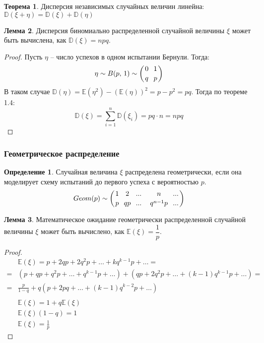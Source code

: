 \documentclass[12pt]{article}
\theoremstyle{definition}
\newtheorem{theorem}{Теорема}[section]
\newtheorem{lemma}[theorem]{Лемма}
\newtheorem{definition}{Определение}
\newcommand{\E}{\mathbb{E}}
\newcommand{\D}{\mathbb{D}}
\begin{document}
\begin{theorem}
    Дисперсия независимых случайных величин линейна: $\D(\xi+\eta)=\D(\xi)+\D(\eta)$
\end{theorem}

\begin{lemma}
    Дисперсия биномиально распределенной случайной величины $\xi$ может быть вычислена, как $\D(\xi)=npq$.
\end{lemma}

\begin{proof}
    Пусть $\eta$ -- число успехов в одном испытании Бернули. Тогда:
    $$\eta \sim B(p,\,1) \sim \left({0 \atop q} \,\,\, {1 \atop p}\right)$$
    В таком случае $\D(\eta)=\E(\eta^2)-(\E(\eta))^2=p-p^2=pq$. Тогда по теореме 1.4:
    $$\D(\xi)=\sum_{i=1}^{n}\D(\xi_i)=pq \cdot n = npq$$
\end{proof}

\subsubsection{Геометрическое распределение}

\begin{definition}
    Случайная величина $\xi$ распределена геометрически, если она моделирует схему испытаний до первого успеха с вероятностью $p$.
    $$Geom(p) \sim \left( {1 \atop p} \,\,\, {2 \atop qp} \,\,\, {... \atop ...} \,\,\, \,\,\, {n \atop q^{n-1}p} \,\,\, {... \atop ...}\right)$$
\end{definition}

\begin{lemma}
    Математическое ожидание геометрически распределенной случайной величины $\xi$ может быть вычислено, как $\E(\xi)=\dfrac{1}{p}$.
\end{lemma}

\begin{proof}
    \begin{align*}
        &\E(\xi)=p+2qp+2q^2p+\ldots+kq^{k-1}p+\ldots=\\
        =&(p+qp+q^2p+\ldots+q^{k-1}p+\ldots)+(qp+2q^2p+\ldots+(k-1)q^{k-1}p+\ldots)=\\
        =&\frac{p}{1-q}+q(p+2pq+\ldots+(k-1)q^{k-2}p+\ldots)\\\\
        &\E(\xi)=1+q\E(\xi)\\
        &\E(\xi)(1-q)=1\\
        &\E(\xi)=\frac{1}{p}
    \end{align*}
\end{proof}
\end{document}
